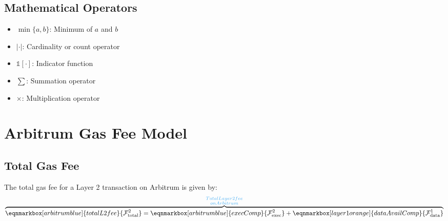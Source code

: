 \documentclass[letterpaper,10pt]{article} %
\newcommand{\fee}[2]{\mathcal{F}_{#1}^{#2}}
\begin{document}
\subsection{Mathematical Operators} %

\begin{itemize}
    \item $\min\{a, b\}$: Minimum of $a$ and $b$
    \item $|\cdot|$: Cardinality or count operator
    \item $\mathbb{1}[\cdot]$: Indicator function
    \item $\sum$: Summation operator
    \item $\times$: Multiplication operator
\end{itemize}

\section{Arbitrum Gas Fee Model} %

\subsection{Total Gas Fee} %

The total gas fee for a Layer 2 transaction on Arbitrum is given by:
\begin{equation}
    \label{eq:arbitrum_total_fee}
    \overbrace{
        \eqnmarkbox[arbitrumblue]{totalL2fee}{\fee{\text{total}}{2}} = 
        \eqnmarkbox[arbitrumblue]{execComp}{\fee{\text{exec}}{2}} + 
        \eqnmarkbox[layer1orange]{dataAvailComp}{\fee{\text{data}}{1}}
    }^{\substack{\textcolor{arbitrumblue!85}{Total Layer 2 fee} \\ \textcolor{arbitrumblue!85}{on Arbitrum} }}
\end{equation}
\end{document}
